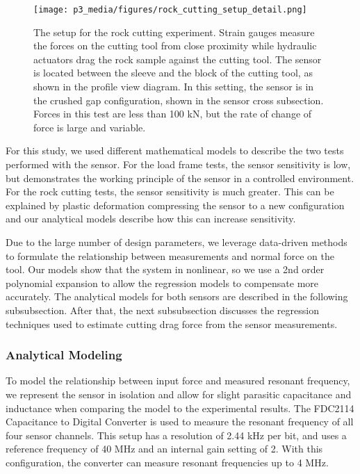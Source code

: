 \begin{figure}[t]
\centering
\texttt{[image: p3\_media/figures/rock\_cutting\_setup\_detail.png]}
\caption{The setup for the rock cutting experiment. Strain gauges measure the forces on the cutting tool from
close proximity while hydraulic actuators drag the rock sample against the cutting tool. The sensor is 
located between the sleeve and the block of the cutting tool, as shown in the profile view diagram.
In this setting, the sensor is in the crushed gap configuration, shown in the sensor cross subsection.
Forces in this test are less than 100 kN, but the rate of change of force is large and variable.}
\label{fig:lcm}
\end{figure}


For this study, we used different mathematical models to describe the 
two tests performed with the sensor.
For the load frame tests, the sensor sensitivity is low, but demonstrates
the working principle of the sensor in a controlled environment.
For the rock cutting tests, the sensor sensitivity is much greater.
This can be explained by plastic deformation compressing the sensor 
to a new configuration and our analytical models describe how this can increase sensitivity.

Due to the large number of design parameters,
 we leverage data-driven methods to formulate
the relationship between measurements and normal force on the tool.
Our models show that the system in nonlinear, so we use a 2nd order polynomial
expansion to allow the regression models to compensate more accurately.
The analytical models for both sensors are described in the following subsubsection.
After that, the next subsubsection discusses the regression techniques used 
to estimate cutting drag force from the sensor measurements.

\subsubsection{Analytical Modeling}
To model the relationship between input force and measured resonant frequency, 
we represent the sensor in isolation and allow for slight parasitic capacitance and inductance
when comparing the model to the experimental results. 
The FDC2114 Capacitance to Digital Converter
is used to measure the resonant frequency of all four sensor channels.
This setup has a resolution of 2.44 kHz per bit, and uses
a reference frequency of 40 MHz and an internal gain setting of 2.
With this configuration, the converter can measure resonant frequencies up to 4 MHz.

